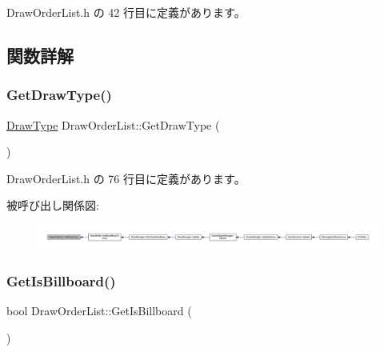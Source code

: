  Draw\+Order\+List.\+h の 42 行目に定義があります。



\subsection{関数詳解}
\mbox{\label{class_draw_order_list_a50dcac9d342e61f67b4d2a1d9a96bb21}} 
\subsubsection{\texorpdfstring{Get\+Draw\+Type()}{GetDrawType()}}
{\footnotesize\ttfamily \mbox{\hyperlink{class_draw_order_list_a6c9b9ceb312c16d399ef355f4f3486bb}{Draw\+Type}} Draw\+Order\+List\+::\+Get\+Draw\+Type (\begin{DoxyParamCaption}{ }\end{DoxyParamCaption})\hspace{0.3cm}{\ttfamily [inline]}}



 Draw\+Order\+List.\+h の 76 行目に定義があります。

被呼び出し関係図\+:
\nopagebreak
\begin{figure}[H]
\begin{center}
\leavevmode
\includegraphics[width=350pt]{class_draw_order_list_a50dcac9d342e61f67b4d2a1d9a96bb21_icgraph}
\end{center}
\end{figure}
\mbox{\label{class_draw_order_list_a265a403c0d87abbcdc71d37a2c4f7b57}} 
\subsubsection{\texorpdfstring{Get\+Is\+Billboard()}{GetIsBillboard()}}
{\footnotesize\ttfamily bool Draw\+Order\+List\+::\+Get\+Is\+Billboard (\begin{DoxyParamCaption}{ }\end{DoxyParamCaption})\hspace{0.3cm}{\ttfamily [inline]}}



